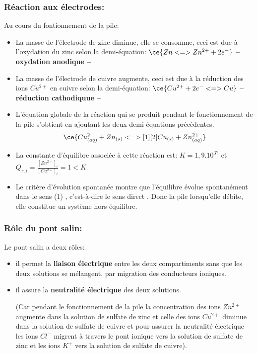 \documentclass[12pt]{article}
\begin{document}
\subsubsection{Réaction aux électrodes: }

Au cours du fontionnement de la pile: 

\begin{itemize}

	\item La masse de l'électrode de zinc diminue, elle se consomme, ceci est due à l'oxydation du zinc selon la demi-équation: $\ce{Zn <=> Zn^{2+} + 2e^-}$  \textbf{	--oxydation anodique --}

	\item La masse de l'électrode de cuivre augmente, ceci est due à la réduction des ions $Cu^{2+}$ en cuivre selon la demi-équation: $\ce{Cu^{2+}  + 2e^- <=> Cu}$  \textbf{-- réduction cathodiquue -- }

	\item L'équation globale de la réaction qui se produit pendant le fonctionnement de la pile s'obtient en ajoutant les deux demi équations précédentes. $$\ce{Cu^{2+}_{(aq)}  + Zn_{(s)} <=>[1][2] Cu_{(s)} + Zn^{2+}_{(aq)}}$$

	\item La constante d'équilibre associée à cette réaction est: $K=1,9.10^{37}$ et $Q_{r,i} = \frac{[Zn^{2+}]_i}{[Cu^{2+}]_i} = 1 < K$
	\item Le critère d’évolution spontanée montre que l'équilibre évolue spontanément dans le sens (1) , c'est-à-dire le sens direct .
Donc la pile lorsqu’elle débite, elle constitue un système hors équilibre.
\end{itemize}


\subsubsection{Rôle du pont salin: }

Le pont salin a deux rôles: 

\begin{itemize}
	\item il permet la \textbf{liaison électrique} entre les deux compartiments sans que les deux solutions se mélangent, par migration des
conducteurs ioniques.

\item il assure la \textbf{neutralité électrique }des deux solutions.

(Car pendant le fonctionnement de la pile la concentration des ions $Zn^{2+}$ augmente dans la solution de sulfate de zinc et celle
des ions $Cu^{2+}$ diminue dans la solution de sulfate de cuivre et pour assurer la neutralité électrique les ions $Cl^-$ migrent à travers
le pont ionique vers la solution de sulfate de zinc et les ions $K^+$ vers la solution de sulfate de cuivre).
\end{itemize}
\end{document}
